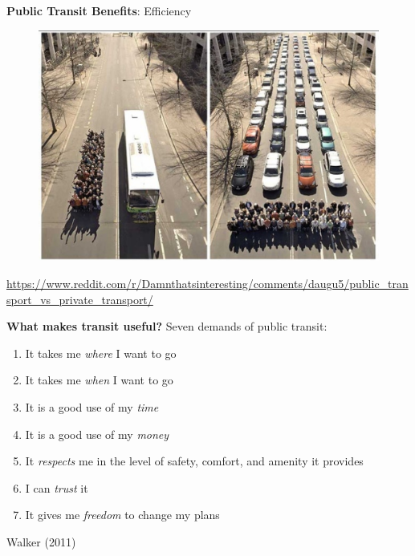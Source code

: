 \documentclass[aspectratio=169]{beamer}
\begin{document}
\begin{frame}
\begin{columns}
\begin{column}{0.5\textwidth}
		\end{column}
		
	\end{columns}
\end{frame}





\begin{frame}
	
	\textbf{Public Transit Benefits}: Efficiency
	
	\begin{figure}
		\centering
		\includegraphics[width=0.8\linewidth]{images/transit_vs_car.jpg}
	\end{figure}

	\tiny\url{https://www.reddit.com/r/Damnthatsinteresting/comments/daugu5/public_transport_vs_private_transport/}
	
\end{frame}




\begin{frame}

	\textbf{What makes transit useful?} Seven demands of public transit:
	
	\vspace{2mm}
	
	\small
	\begin{enumerate}
		\item It takes me \textit{where} I want to go
		\item It takes me \textit{when} I want to go
		\item It is a good use of my \textit{time}
		\item It is a good use of my \textit{money}
		\item It \textit{respects} me in the level of safety, comfort, and amenity it provides
		\item I can \textit{trust} it
		\item It gives me \textit{freedom} to change my plans
	\end{enumerate}

	\vspace{2mm}
	
	Walker (2011)

\end{frame}
\end{document}

